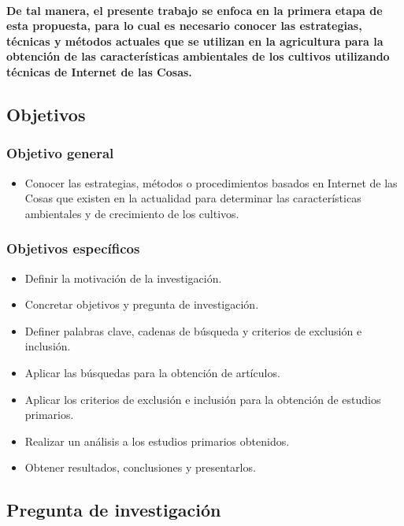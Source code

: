 \documentclass[10pt, twocolumn]{article}
\begin{document}
\paragraph{De tal manera, el presente trabajo se enfoca en la primera etapa de esta propuesta, para lo cual es necesario conocer las estrategias, técnicas y métodos actuales que se utilizan en la agricultura para la obtención de las características ambientales de los cultivos utilizando técnicas de Internet de las Cosas.}

\subsection{Objetivos}
\subsubsection{Objetivo general}
\begin{itemize}
	\item{Conocer las estrategias, métodos o procedimientos basados en Internet de las Cosas que existen en la actualidad para determinar las características ambientales y de crecimiento de los cultivos.}
\end{itemize}
\subsubsection{Objetivos específicos}
\begin{itemize}
	\item{Definir la motivación de la investigación.}
	\item{Concretar objetivos y pregunta de investigación.}
	\item{Definer palabras clave, cadenas de búsqueda y criterios de exclusión e inclusión.}
	\item{Aplicar las búsquedas para la obtención de artículos.}
	\item{Aplicar los criterios de exclusión e inclusión para la obtención de estudios primarios.}
	\item{Realizar un análisis a los estudios primarios obtenidos.}
	\item{Obtener resultados, conclusiones y presentarlos.}
\end{itemize}

\subsection{Pregunta de investigación}
\end{document}

